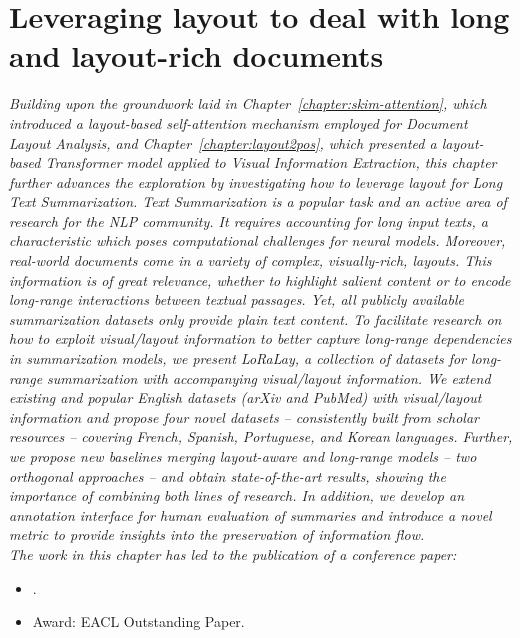 
\chapter{Leveraging layout to deal with long and layout-rich documents}
\label{chapter:loralay}

\renewcommand{\leftmark}{\spacedlowsmallcaps{Leveraging layout to deal with long and layout-rich documents}}

\begin{chapabstract}
    {\em
    Building upon the groundwork laid in Chapter~\ref{chapter:skim-attention}, which introduced a layout-based self-attention mechanism employed for Document Layout Analysis, and Chapter~\ref{chapter:layout2pos}, which presented a layout-based Transformer model applied to Visual Information Extraction, this chapter further advances the exploration by investigating how to leverage layout for Long Text Summarization.
    Text Summarization is a popular task and an active area of research for the \ac{NLP} community. It requires accounting for long input texts, a characteristic which poses computational challenges for neural models. 
    Moreover, real-world documents come in a variety of complex, visually-rich, layouts. This information is of great relevance, whether to highlight salient content or to encode long-range interactions between textual passages. Yet, all publicly available summarization datasets only provide plain text content.
    To facilitate research on how to exploit visual/layout information to better capture long-range dependencies in summarization models, we present \textit{LoRaLay}, a collection of datasets for long-range summarization with accompanying visual/layout information. We extend existing and popular English datasets (arXiv and PubMed) with visual/layout information and propose four novel datasets -- consistently built from scholar resources -- covering French, Spanish, Portuguese, and Korean languages.
    Further, we propose new baselines merging layout-aware and long-range models -- two orthogonal approaches -- and obtain state-of-the-art results, showing the importance of combining both lines of research. In addition, we develop an annotation interface for human evaluation of summaries and introduce a novel metric to provide insights into the preservation of information flow. \\
    \vspace*{5mm}
    The work in this chapter has led to the publication of a conference paper:}
    \begin{itemize}
        \item \small {}.
        \item \small Award: EACL Outstanding Paper.
    \end{itemize}
\end{chapabstract}


